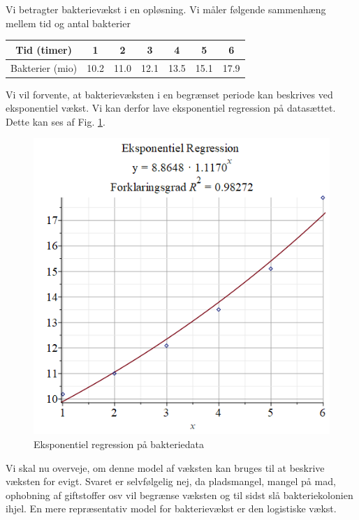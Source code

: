 \begin{exa}
Vi betragter bakterievækst i en opløsning. Vi måler følgende sammenhæng mellem tid og antal bakterier
\begin{center}
\begin{tabular}{c|c|c|c|c|c|c}
Tid (timer) & 1 & 2 & 3 & 4 & 5 & 6 \\ \hline 
Bakterier (mio) & 10.2 & 11.0 & 12.1 & 13.5 & 15.1 & 17.9
\end{tabular}
\end{center}
Vi vil forvente, at bakterievæksten i en begrænset periode kan beskrives ved eksponentiel vækst. Vi kan derfor lave eksponentiel regression på datasættet. Dette kan ses af Fig. \ref{fig:expreg}.
\begin{figure}[H]
\centering
\includegraphics[width=\textwidth*3/4]{Billeder/expreg2.png}
\caption{Eksponentiel regression på bakteriedata}
\label{fig:expreg}
\end{figure}
Vi skal nu overveje, om denne model af væksten kan bruges til at beskrive væksten for evigt. Svaret er selvfølgelig nej, da pladsmangel, mangel på mad, ophobning af giftstoffer osv vil begrænse væksten og til sidst slå bakteriekolonien ihjel. En mere repræsentativ model for bakterievækst er den logistiske vækst. 
\end{exa}

